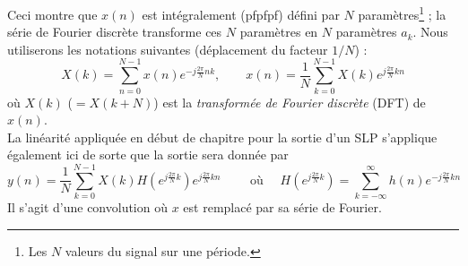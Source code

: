 	


\newpage
Ceci montre que $x(n)$ est intégralement (pfpfpf) défini par $N$ paramètres\footnote{
Les $N$ valeurs du signal sur une période.} ; la série de Fourier discrète transforme 
ces $N$ paramètres en $N$ paramètres $a_k$. Nous utiliserons les notations suivantes 
(déplacement du facteur $1/N$) :
\begin{equation}
X(k) = \sum_{n=0}^{N-1} x(n)e^{-j\frac{2\pi}{N}nk},\qquad x(n) =\frac{1}{N}\sum_{
k=0}^{N-1} X(k)e^{j\frac{2\pi}{N}kn}
\end{equation}
où $X(k)$ ($=X(k+N)$) est la \textit{transformée de Fourier discrète} (DFT) de $x(n)$.\\
La linéarité appliquée en début de chapitre pour la sortie d'un SLP s'applique également 
ici de sorte que la sortie sera donnée par
\begin{equation}
y(n) = \frac{1}{N}\sum_{k=0}^{N-1} X(k)H\left(e^{j\frac{2\pi}{N}k}\right)
e^{j\frac{2\pi}{N}kn}\qquad \text{ où }\quad H\left(e^{j\frac{2\pi}{N}k}\right) = 
\sum_{k=-\infty}^\infty h(n)e^{-j\frac{2\pi}{N}kn}
\end{equation}
Il s'agit d'une convolution où $x$ est remplacé par sa série de Fourier.
	
